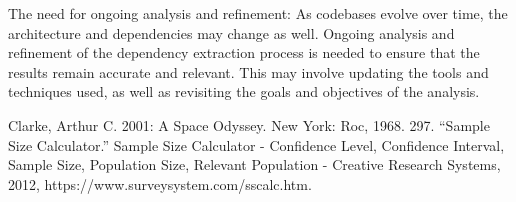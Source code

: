 \documentclass[12pt, dvipsnames, a4paper]{article}
\begin{document}
The need for ongoing analysis and refinement: As codebases evolve over time, the architecture and dependencies may change as well. Ongoing analysis and refinement of the dependency extraction process is needed to ensure that the results remain accurate and relevant. This may involve updating the tools and techniques used, as well as revisiting the goals and objectives of the analysis.






\begin{thebibliography}{00}
	 Clarke, Arthur C. 2001: A Space Odyssey. New York: Roc, 1968. 297.
	 “Sample Size Calculator.” Sample Size Calculator - Confidence Level, Confidence Interval, Sample Size, Population Size, Relevant Population - Creative Research Systems, 2012, https://www.surveysystem.com/sscalc.htm. 
\end{thebibliography}
\end{document}
